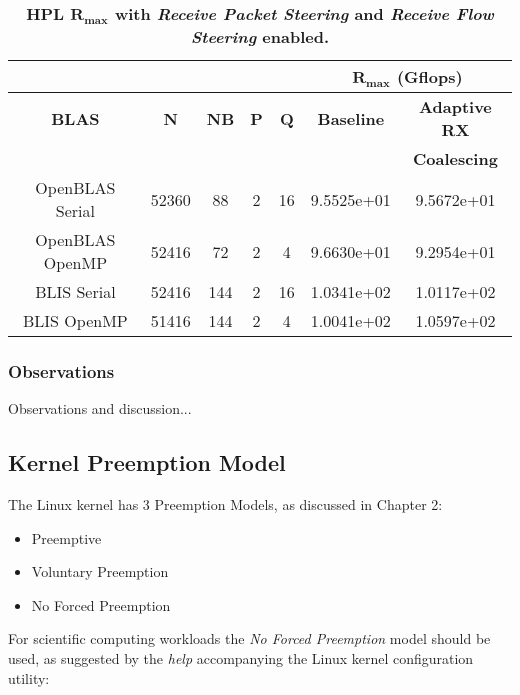 \begin{table}[H]
\begin{center}
\begin{tabular}{ |c|c|c|c|c|c|c| } 
\hline
\multicolumn{5}{|c}{} & \multicolumn{2}{|c|}{$\mathbf{R_{max}}$ \textbf{(Gflops)}} \\
\hline
\textbf{BLAS} & \textbf{N} & \textbf{NB} & \textbf{P} & \textbf{Q} & \textbf{Baseline}  & \textbf{Adaptive RX}  \\
              &            &             &            &            &                    & \textbf{Coalescing} \\
\hline
OpenBLAS Serial & 52360 & 88 & 2 & 16 & 9.5525e+01 & 9.5672e+01 \\
\hline
OpenBLAS OpenMP & 52416 & 72 & 2 & 4 & 9.6630e+01 & 9.2954e+01 \\
\hline
BLIS Serial     & 52416 & 144 & 2 & 16 & 1.0341e+02 & 1.0117e+02 \\
\hline
BLIS OpenMP     & 51416 & 144 & 2 & 4 & 1.0041e+02 & 1.0597e+02 \\
\hline
\end{tabular}
\end{center}
\caption{\label{tab:table-name}\textbf{HPL $\mathbf{R_{max}}$ with \emph{Receive Packet Steering} and \emph{Receive Flow Steering} enabled.}}
\end{table}


\subsubsection{Observations}

Observations and discussion...



%
%
\subsection{Kernel Preemption Model}

The Linux kernel has 3 Preemption Models, as discussed in Chapter 2:

\begin{itemize}
\item Preemptive
\item Voluntary Preemption
\item No Forced Preemption
\end{itemize}

For scientific computing workloads the \emph{No Forced Preemption} model should be used, as suggested by the \emph{help} accompanying the Linux kernel configuration utility:

